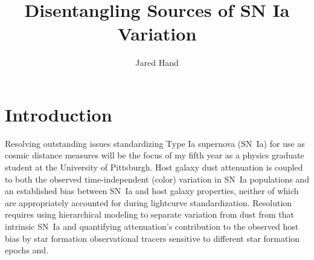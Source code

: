 \documentclass[modern]{aastex63}
\begin{document}
\title{Disentangling Sources of SN Ia Variation}

\author{Jared Hand}

\section{Introduction}
Resolving outstanding issues standardizing Type Ia supernova (SN~Ia) for use as cosmic distance measures will be the focus of my fifth year as a physics graduate student at the University of Pittsburgh. Host galaxy dust attenuation is coupled to both the observed time-independent (color) variation in SN~Ia populations and an established bias between SN~Ia and host galaxy properties, neither of which are appropriately accounted for during lightcurve standardization. Resolution requires using hierarchical modeling to separate variation from dust from that intrinsic SN~Ia and quantifying attenuation's contribution to the observed host bias by star formation observational tracers sensitive to different star formation epochs and.  
\end{document}
